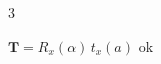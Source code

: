 \documentclass[9pt]{extarticle}
\begin{document}
\begin{multicols}{3}
\begin{tcolorbox}[title=Test,colback=black!5]$\mathbf T = R_x(\alpha)\,t_x(a)$ ok\end{tcolorbox}
\end{multicols}
\end{document}
